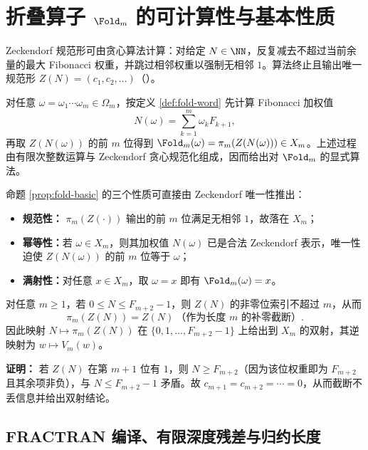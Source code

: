 \section{折叠算子 \texorpdfstring{$\Fold_m$}{Fold\_m} 的可计算性与基本性质}
\label{app:fold-computability}

Zeckendorf 规范形可由贪心算法计算：对给定 $N\in\NN$，反复减去不超过当前余量的最大 Fibonacci 权重，并跳过相邻权重以强制无相邻 $1$。算法终止且输出唯一规范形 $Z(N)=(c_1,c_2,\dots)$（\cite{Zeckendorf1972}）。

对任意 $\omega=\omega_1\cdots\omega_m\in\Omega_m$，按定义 \ref{def:fold-word} 先计算 Fibonacci 加权值
\[
N(\omega)=\sum_{k=1}^m \omega_k F_{k+1},
\]
再取 $Z(N(\omega))$ 的前 $m$ 位得到 $\Fold_m(\omega)=\pi_m(Z(N(\omega)))\in X_m$。上述过程由有限次整数运算与 Zeckendorf 贪心规范化组成，因而给出对 $\Fold_m$ 的显式算法。

命题 \ref{prop:fold-basic} 的三个性质可直接由 Zeckendorf 唯一性推出：
\begin{itemize}
  \item \textbf{规范性：} $\pi_m(Z(\cdot))$ 输出的前 $m$ 位满足无相邻 $1$，故落在 $X_m$；
  \item \textbf{幂等性：}若 $\omega\in X_m$，则其加权值 $N(\omega)$ 已是合法 Zeckendorf 表示，唯一性迫使 $Z(N(\omega))$ 的前 $m$ 位等于 $\omega$；
  \item \textbf{满射性：}对任意 $x\in X_m$，取 $\omega=x$ 即有 $\Fold_m(\omega)=x$。
\end{itemize}

\begin{lemma}\label{lem:zeckendorf-range-bijection}
对任意 $m\ge 1$，若 $0\le N\le F_{m+2}-1$，则 $Z(N)$ 的非零位索引不超过 $m$，从而
\[
\pi_m(Z(N))=Z(N)\ \text{（作为长度 }m\text{ 的补零截断）}.
\]
因此映射 $N\mapsto \pi_m(Z(N))$ 在 $\{0,1,\dots,F_{m+2}-1\}$ 上给出到 $X_m$ 的双射，其逆映射为 $w\mapsto V_m(w)$。
\end{lemma}

\textbf{证明：}
若 $Z(N)$ 在第 $m+1$ 位有 $1$，则 $N\ge F_{m+2}$（因为该位权重即为 $F_{m+2}$ 且其余项非负），与 $N\le F_{m+2}-1$ 矛盾。故 $c_{m+1}=c_{m+2}=\cdots=0$，从而截断不丢信息并给出双射结论。

\subsection{FRACTRAN 编译、有限深度残差与归约长度}\label{subsec:fold-computability-fractran}


